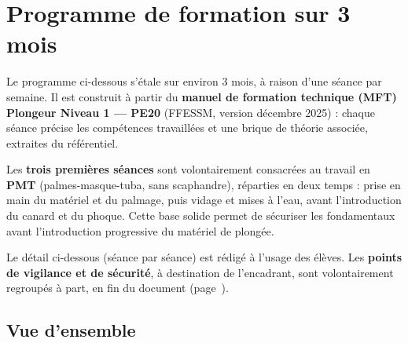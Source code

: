 \section{Programme de formation sur 3 mois}
\label{sec:planning}

Le programme ci-dessous s'étale sur environ 3 mois, à raison d'une séance par semaine. Il
est construit à partir du \textbf{manuel de formation technique (MFT) Plongeur Niveau 1 ---
PE20} (FFESSM, version décembre 2025) : chaque séance précise les compétences travaillées et
une brique de théorie associée, extraites du référentiel.

Les \textbf{trois premières séances} sont volontairement consacrées au travail en
\textbf{PMT} (palmes-masque-tuba, sans scaphandre), réparties en deux temps : prise en main
du matériel et du palmage, puis vidage et mises à l'eau, avant l'introduction du canard et du
phoque. Cette base solide permet de sécuriser les fondamentaux avant l'introduction
progressive du matériel de plongée.

Le détail ci-dessous (séance par séance) est rédigé à l'usage des élèves. Les
\textbf{points de vigilance et de sécurité}, à destination de l'encadrant, sont volontairement
regroupés à part, en fin du document (page~\pageref{sec:vigilance}).

\subsection{Vue d'ensemble}

